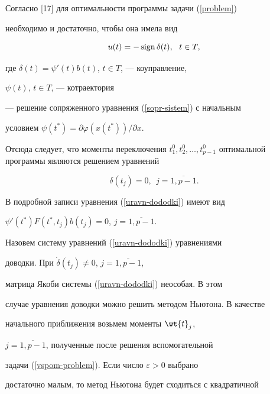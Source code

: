 Согласно [17] для оптимальности программы задачи (\ref{problem})


необходимо и достаточно, чтобы она имела вид


\begin{equation}\label{krit-optim-nepr}


u(t)=-\sign\delta(t),\ \ t\in T,


\end{equation}


где $\delta(t)=\psi'(t)b(t)$, $t\in T$, --- коуправление,


$\psi(t)$, $t\in T$, --- котраектория


--- решение сопряженного уравнения (\ref{sopr-sistem}) с начальным


условием $\psi(t^*)=\partial\varphi(x(t^*))/\partial x$.





Отсюда следует, что моменты переключения $t_1^0, t_2^0,\dotsc,


t_{p-1}^0$ оптимальной программы являются решением уравнений


\begin{equation}\label{uravn-dododki}


\delta(t_j)=0,\ \ j=\overline{1,p-1}.


\end{equation}





В подробной записи уравнения (\ref{uravn-dododki}) имеют вид


$\psi'(t^*)F(t^*,t_j)b(t_j)=0$, $j=\overline{1,p-1}$.





Назовем систему уравнений (\ref{uravn-dododki}) уравнениями


доводки. При $\dot{\delta}(t_j)\neq0$, $j=\overline{1,p-1}$,


матрица Якоби системы (\ref{uravn-dododki}) неособая. В этом


случае уравнения доводки можно решить методом Ньютона. В качестве


начального приближения возьмем моменты $\wt{t}_j$,


$j=\overline{1,p-1}$, полученные после решения вспомогательной


задачи (\ref{vspom-problem}). Если число $\varepsilon>0$ выбрано


достаточно малым, то метод Ньютона будет сходиться с квадратичной


